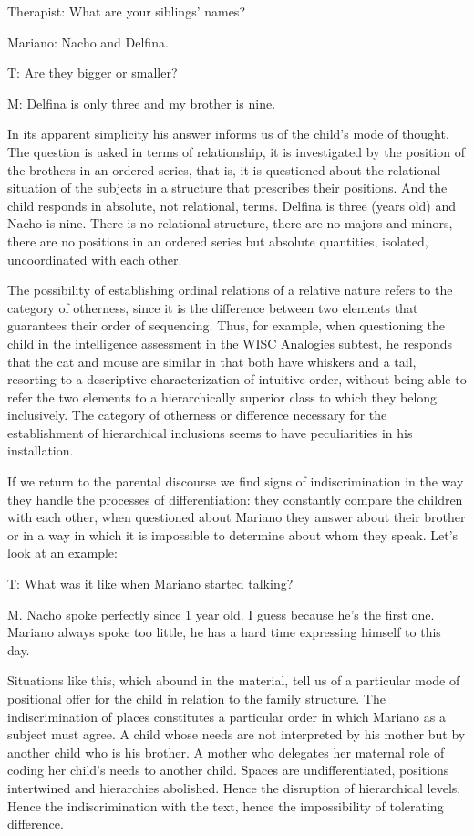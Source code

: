 \documentclass[english]{textolivre}
\begin{document}
Therapist: What are your siblings' names?

Mariano: Nacho and Delfina.

T: Are they bigger or smaller?

M: Delfina is only three and my brother is nine.

In its apparent simplicity his answer informs us of the child's mode of thought. The question is asked in terms of relationship, it is investigated by the position of the brothers in an ordered series, that is, it is questioned about the relational situation of the subjects in a structure that prescribes their positions. And the child responds in absolute, not relational, terms. Delfina is three (years old) and Nacho is nine. There is no relational structure, there are no majors and minors, there are no positions in an ordered series but absolute quantities, isolated, uncoordinated with each other.

The possibility of establishing ordinal relations of a relative nature refers to the category of otherness, since it is the difference between two elements that guarantees their order of sequencing. Thus, for example, when questioning the child in the intelligence assessment in the WISC Analogies subtest, he responds that the cat and mouse are similar in that both have whiskers and a tail, resorting to a descriptive characterization of intuitive order, without being able to refer the two elements to a hierarchically superior class to which they belong inclusively. The category of otherness or difference necessary for the establishment of hierarchical inclusions seems to have peculiarities in his installation.

If we return to the parental discourse we find signs of indiscrimination in the way they handle the processes of differentiation: they constantly compare the children with each other, when questioned about Mariano they answer about their brother or in a way in which it is impossible to determine about whom they speak. Let's look at an example:

T: What was it like when Mariano started talking?

M. Nacho spoke perfectly since 1 year old. I guess because he’s the first one. Mariano always spoke too little, he has a hard time expressing himself to this day.

Situations like this, which abound in the material, tell us of a particular mode of positional offer for the child in relation to the family structure. The indiscrimination of places constitutes a particular order in which Mariano as a subject must agree. A child whose needs are not interpreted by his mother but by another child who is his brother. A mother who delegates her maternal role of coding her child's needs to another child. Spaces are undifferentiated, positions intertwined and hierarchies abolished. Hence the disruption of hierarchical levels. Hence the indiscrimination with the text, hence the impossibility of tolerating difference.
\end{document}
